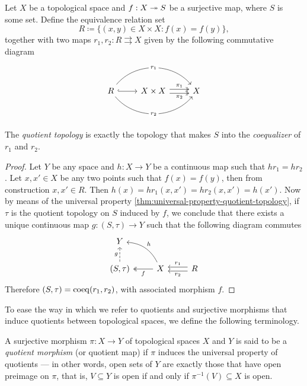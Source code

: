 \begin{proposition}
\label{prop:quotient-top-as-coequalizer}
Let \(X\) be a topological space and \(f: X \twoheadrightarrow S\) be a surjective
map, where \(S\) is some set. Define the equivalence relation set
\[
R \coloneq \{(x, y) \in X \times X \colon f(x) = f(y)\},
\]
together with two maps \(r_1, r_2: R \rightrightarrows X\) given by the
following commutative diagram
\[
\begin{tikzcd}
R \ar[r, hook] \ar[rr, bend left=50, "r_1" description]
\ar[rr, bend right=50, "r_2" description]
&X \times X \ar[r, two heads, shift left, "\pi_1"]
\ar[r, two heads, shift right, "\pi_2"']
&X
\end{tikzcd}
\]

The \emph{quotient topology} is exactly the topology that makes \(S\) into the
\emph{coequalizer} of \(r_1\) and \(r_2\).
\end{proposition}

\begin{proof}
Let \(Y\) be any space and \(h: X \to Y\) be a continuous map such that
\(h r_1 = h r_2\). Let \(x, x' \in X\) be any two points such that
\(f(x) = f(y)\), then from construction \(x, x' \in R\). Then
\(h(x) = h r_1(x, x') = h r_2(x, x') = h(x')\). Now by means of the universal
property \cref{thm:universal-property-quotient-topology}, if \(\tau\) is the
quotient topology on \(S\) induced by \(f\), we conclude that there
exists a unique continuous map \(g: (S, \tau) \to Y\) such that the following
diagram commutes
\[
\begin{tikzcd}
Y & & \\
(S, \tau) \ar[u, dashed, "g"]
&X \ar[l, two heads, "f"]
\ar[lu, bend right, "h"']
&R \ar[l, shift right, "r_1"'] \ar[l, shift left, "r_2"]
\end{tikzcd}
\]
Therefore \((S, \tau) = \operatorname{coeq}(r_1, r_2)\), with associated morphism \(f\).
\end{proof}

To ease the way in which we refer to quotients and surjective morphisms that
induce quotients between topological spaces, we define the following
terminology.

\begin{definition}
\label{def:quotient-morphism}
A surjective morphism \(\pi: X \to Y\) of topological spaces \(X\) and \(Y\) is
said to be a \emph{quotient morphism} (or quotient map) if \(\pi\) induces the
universal property of quotients --- in other words, open sets of \(Y\) are
exactly those that have open preimage on \(\pi\), that is, \(V \subseteq Y\) is
open if and only if \(\pi^{-1}(V) \subseteq X\) is open.
\end{definition}

